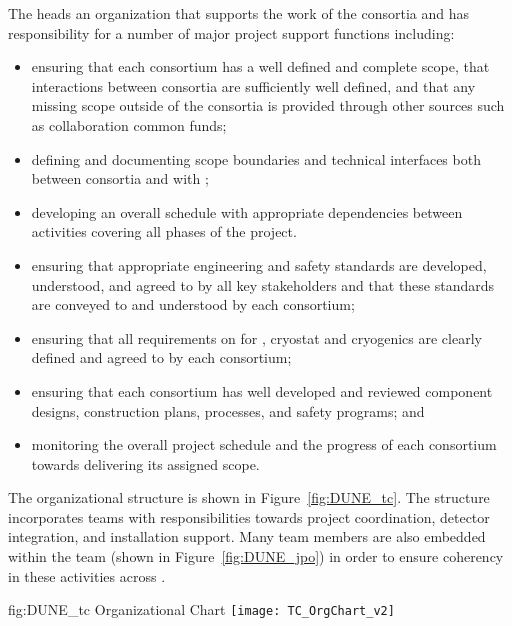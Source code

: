 The  heads an organization that supports the work of 
the consortia and has responsibility for a number of major project 
support functions including:
\begin{itemize}
\item ensuring that each consortium has a well defined and complete
  scope, that interactions between consortia are sufficiently 
  well defined, and that any missing scope outside of the 
  consortia is provided through other sources such as collaboration
  common funds;
\item defining and documenting scope boundaries and technical 
  interfaces both between consortia and with ;  
\item developing an overall schedule with appropriate dependencies
  between activities covering all phases of the project. 
\item ensuring that appropriate engineering and safety standards 
  are developed, understood, and agreed to by all key stakeholders 
  and that these standards are conveyed to and understood by each
  consortium;
\item ensuring that all  requirements on  
  for , cryostat and cryogenics are clearly defined and 
  agreed to by each consortium;
\item ensuring that each consortium has well developed and reviewed
  component designs, construction plans,  processes, and 
  safety programs; and
\item monitoring the overall project schedule and the progress of 
  each consortium towards delivering its assigned scope. 
\end{itemize}

The   organizational structure is shown 
in Figure~\ref{fig:DUNE_tc}.  The structure incorporates teams 
with responsibilities towards project coordination, detector 
integration, and installation support.  Many  team 
members are also embedded within the  team (shown 
in Figure~\ref{fig:DUNE_jpo}) in order to ensure coherency in 
these activities across .
\begin{dunefigure}{fig:DUNE_tc}
  {  Organizational Chart}
  \texttt{[image: TC\_OrgChart\_v2]}
\end{dunefigure}
 
